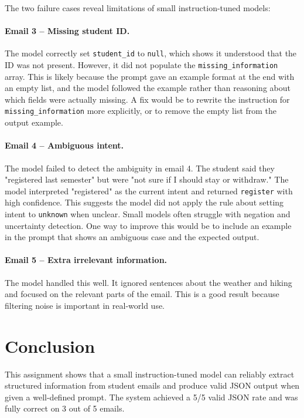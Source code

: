 \documentclass[11pt,a4paper]{article}
\begin{document}
The two failure cases reveal limitations of small instruction-tuned models:

\paragraph{Email 3 -- Missing student ID.}
The model correctly set \texttt{student\_id} to \texttt{null}, which shows it understood that the ID was not present. However, it did not populate the \texttt{missing\_information} array. This is likely because the prompt gave an example format at the end with an empty list, and the model followed the example rather than reasoning about which fields were actually missing. A fix would be to rewrite the instruction for \texttt{missing\_information} more explicitly, or to remove the empty list from the output example.

\paragraph{Email 4 -- Ambiguous intent.}
The model failed to detect the ambiguity in email 4. The student said they "registered last semester" but were "not sure if I should stay or withdraw." The model interpreted "registered" as the current intent and returned \texttt{register} with high confidence. This suggests the model did not apply the rule about setting intent to \texttt{unknown} when unclear. Small models often struggle with negation and uncertainty detection. One way to improve this would be to include an example in the prompt that shows an ambiguous case and the expected output.

\paragraph{Email 5 -- Extra irrelevant information.}
The model handled this well. It ignored sentences about the weather and hiking and focused on the relevant parts of the email. This is a good result because filtering noise is important in real-world use.

\section{Conclusion}

This assignment shows that a small instruction-tuned model can reliably extract structured information from student emails and produce valid JSON output when given a well-defined prompt. The system achieved a 5/5 valid JSON rate and was fully correct on 3 out of 5 emails.
\end{document}
